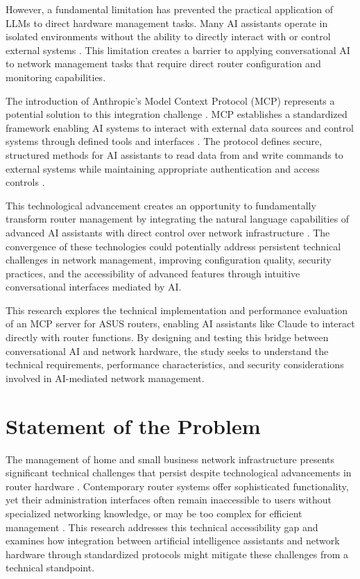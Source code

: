 However, a fundamental limitation has prevented the practical application of LLMs to direct hardware management tasks. Many AI assistants operate in isolated environments without the ability to directly interact with or control external systems \cite{irtf_ai_challenges}. This limitation creates a barrier to applying conversational AI to network management tasks that require direct router configuration and monitoring capabilities.

The introduction of Anthropic's Model Context Protocol (MCP) represents a potential solution to this integration challenge \cite{mcp_intro}. MCP establishes a standardized framework enabling AI systems to interact with external data sources and control systems through defined tools and interfaces \cite{mcp_wandb}. The protocol defines secure, structured methods for AI assistants to read data from and write commands to external systems while maintaining appropriate authentication and access controls \cite{mcp_docs}.

This technological advancement creates an opportunity to fundamentally transform router management by integrating the natural language capabilities of advanced AI assistants with direct control over network infrastructure \cite{ai_mediated_interface}. The convergence of these technologies could potentially address persistent technical challenges in network management, improving configuration quality, security practices, and the accessibility of advanced features through intuitive conversational interfaces mediated by AI.

This research explores the technical implementation and performance evaluation of an MCP server for ASUS routers, enabling AI assistants like Claude to interact directly with router functions. By designing and testing this bridge between conversational AI and network hardware, the study seeks to understand the technical requirements, performance characteristics, and security considerations involved in AI-mediated network management.

\section{Statement of the Problem}
The management of home and small business network infrastructure presents significant technical challenges that persist despite technological advancements in router hardware \cite{soho_sdn}. Contemporary router systems offer sophisticated functionality, yet their administration interfaces often remain inaccessible to users without specialized networking knowledge, or may be too complex for efficient management \cite{home_network_challenges}. This research addresses this technical accessibility gap and examines how integration between artificial intelligence assistants and network hardware through standardized protocols might mitigate these challenges from a technical standpoint.


